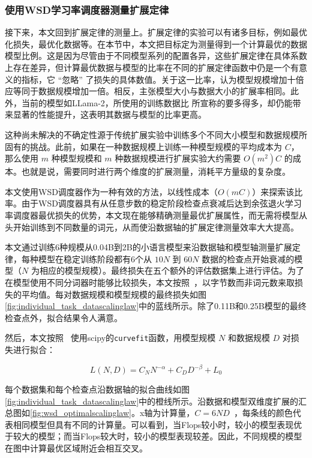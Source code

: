 \subsubsection{使用WSD学习率调度器测量扩展定律}
\label{scalinglawwsdlrs}
接下来，本文回到扩展定律的测量上。扩展定律的实验可以有诸多目标，例如最优化损失，最优化数据等。在本节中，本文把目标定为测量得到一个计算最优的数据模型比例。这是因为尽管由于不同模型系列的配置各异，这些扩展定律在具体系数上存在差异，但计算最优数据与模型的比率在不同的扩展定律函数中仍是一个有意义的指标，它 “忽略” 了损失的具体数值。关于这一比率，\citet{kaplan2020scaling}认为模型规模增加十倍应等同于数据规模增加一倍。相反，\citet{hoffmann2022training}主张模型大小与数据大小的扩展率相同。此外，当前的模型如LLama-2\cite{touvron2023llama}，所使用的训练数据比 \citet{hoffmann2022training} 所宣称的要多得多，却仍能带来显著的性能提升，这表明其数据与模型的比率更高。

这种尚未解决的不确定性源于传统扩展实验中训练多个不同大小模型和数据规模所固有的挑战。此前，如果在一种数据规模上训练一种模型规模的平均成本为 $C$，那么使用 $m$ 种模型规模和 $m$ 种数据规模进行扩展实验大约需要 $O(m^2)C$ 的成本。也就是说，需要同时进行两个维度的扩展测量，消耗平方量级的复杂度。

本文使用WSD调度器作为一种有效的方法，以线性成本（$O(mC)$）来探索该比率。由于WSD调度器具有从任意步数的稳定阶段检查点衰减后达到余弦退火学习率调度器最优损失的优势，本文现在能够精确测量最优扩展属性，而无需将模型从头开始训练到不同数量的词元，从而使沿数据轴的扩展定律测量效率大大提高。

本文通过训练6种规模从0.04B到2B的小语言模型来沿数据轴和模型轴测量扩展定律，每种模型在稳定训练阶段都有6个从 $10N$ 到 $60N$ 数据的检查点开始衰减的模型（$N$ 为相应的模型规模）。最终损失在五个额外的评估数据集上进行评估。为了在模型使用不同分词器时能够比较损失，本文按照~\citet{achiam2023gpt}，以字节数而非词元数来取损失的平均值。每对数据规模和模型规模的最终损失如图\ref{fig:individual_task_datascalinglaw}中的蓝线所示。除了0.11B和0.25B模型的最终检查点外，拟合结果令人满意。 

然后，本文按照~\citet{hoffmann2022training} 使用scipy的\texttt{curvefit}函数，用模型规模 $N$ 和数据规模 $D$ 对损失进行拟合：

\begin{equation}
    L(N, D) = C_NN^{-\alpha} + C_DD^{-\beta} + L_0
\label{equ:scalinglaw}
\end{equation}

每个数据集和每个检查点沿数据轴的拟合曲线如图\ref{fig:individual_task_datascalinglaw}中的橙线所示。沿数据和模型双维度扩展的汇总图如\ref{fig:wsd_optimalscalinglaw}。x轴为计算量，$C = 6ND$~\citep{rae2021scaling}，每条线的颜色代表相同模型但具有不同的计算量。可以看到，当Flops较小时，较小的模型表现优于较大的模型；而当Flops较大时，较小的模型表现较差。因此，不同规模的模型在图中计算最优区域附近会相互交叉。


